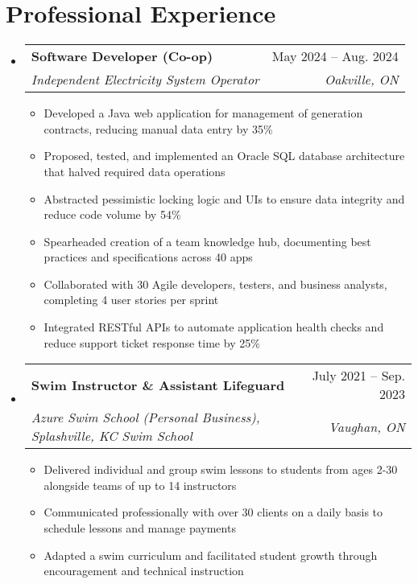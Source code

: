 \documentclass[letterpaper,11pt]{article}
\makeatletter
\newcommand{\resumeItem}[1]{
  \item\small{
    {#1 \vspace{-2pt}}
  }
}
\newcommand{\resumeSubheading}[4]{
  \vspace{-2pt}\item
    \begin{tabular*}{0.97\textwidth}[t]{l@{\extracolsep{\fill}}r}
      \textbf{#1} & #2 \\
      \textit{\small#3} & \textit{\small #4} \\
    \end{tabular*}\vspace{-7pt}
}
\newcommand{\resumeSubSubheading}[2]{
    \item
    \begin{tabular*}{0.97\textwidth}{l@{\extracolsep{\fill}}r}
      \textit{\small#1} & \textit{\small #2} \\
    \end{tabular*}\vspace{-7pt}
}
\newcommand{\resumeSubHeadingListStart}{\begin{itemize}[leftmargin=0.15in, label={}]}
\newcommand{\resumeSubHeadingListEnd}{\end{itemize}}
\newcommand{\resumeItemListStart}{\begin{itemize}}
\newcommand{\resumeItemListEnd}{\end{itemize}\vspace{-5pt}}
\makeatother
\begin{document}
\section{Professional Experience}
  \resumeSubHeadingListStart

    \resumeSubheading
      {Software Developer (Co-op)}{May 2024 -- Aug. 2024}
      {Independent Electricity System Operator}{Oakville, ON}
      \resumeItemListStart
        \resumeItem{Developed a Java web application for management of generation contracts, reducing manual data entry by 35\%}
        \resumeItem{Proposed, tested, and implemented an Oracle SQL database architecture that halved required data operations}
        \resumeItem{Abstracted pessimistic locking logic and UIs to ensure data integrity and reduce code volume by 54\%}
        \resumeItem{Spearheaded creation of a team knowledge hub, documenting best practices and specifications across 40 apps}
        \resumeItem{Collaborated with 30 Agile developers, testers, and business analysts, completing 4 user stories per sprint}
        \resumeItem{Integrated RESTful APIs to automate application health checks and reduce support ticket response time by 25\%}
      \resumeItemListEnd

    \resumeSubheading
      {Swim Instructor \& Assistant Lifeguard}{July 2021 -- Sep. 2023}
      {Azure Swim School (Personal Business), Splashville, KC Swim School}{Vaughan, ON}
      \resumeItemListStart
        \resumeItem{Delivered individual and group swim lessons to students from ages 2-30 alongside teams of up to 14 instructors}
        \resumeItem{Communicated professionally with over 30 clients on a daily basis to schedule lessons and manage payments}
        \resumeItem{Adapted a swim curriculum and facilitated student growth through encouragement and technical instruction}
      \resumeItemListEnd
      

  \resumeSubHeadingListEnd


\end{document}
